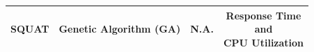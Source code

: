 \begin{longtable}{@{}>{\footnotesize}c >{\footnotesize}c >{\footnotesize}c >{\footnotesize}c@{}}
\midrule
SQUAT & Genetic Algorithm (GA) & N.A. & \makecell{Response Time\\ and \\CPU Utilization}\\
\bottomrule
\end{longtable}








